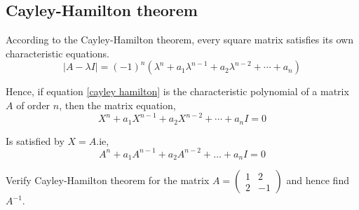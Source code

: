 \subsection{Cayley-Hamilton theorem}
According to the Cayley-Hamilton theorem, every square matrix satisfies its own characteristic equations. 
\begin{equation}
|A-\lambda I|=(-1)^{n}\left(\lambda^{n}+a_{1} \lambda^{n-1}+a_{2} \lambda^{n-2}+\cdots+a_{n}\right)
\label{cayley hamilton}
\end{equation}

Hence, if  equation \ref{cayley hamilton}  is the characteristic polynomial of a matrix $A$ of order $n$, then the matrix equation,
\begin{equation}
X^{n}+a_{1} X^{n-1}+a_{2} X^{n-2}+\cdots+a_{n} I=0
\end{equation}

Is satisfied by $X=A$.ie,
\begin{equation}
A^{n}+a_{1} A^{n-1}+a_{2} A^{n-2}+\ldots+a_{n} I=0
\end{equation} 
\begin{exercise}
	 Verify Cayley-Hamilton theorem for the matrix $A=\left(\begin{array}{cc}1 & 2 \\ 2 & -1\end{array}\right)$ and hence find $A^{-1}$.\end{exercise}


